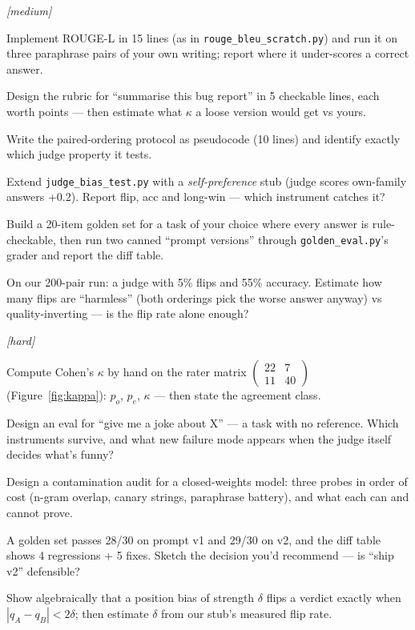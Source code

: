 \emph{[medium]}
\begin{exercise}
Implement ROUGE-L in 15 lines (as in
\texttt{rouge\_bleu\_scratch.py}) and run it on three paraphrase
pairs of your own writing; report where it under-scores a correct
answer.
\end{exercise}
\begin{exercise}
Design the rubric for ``summarise this bug report'' in 5 checkable
lines, each worth points --- then estimate what $\kappa$ a loose
version would get vs yours.
\end{exercise}
\begin{exercise}
Write the paired-ordering protocol as pseudocode (10 lines) and
identify exactly which judge property it tests.
\end{exercise}
\begin{exercise}
Extend \texttt{judge\_bias\_test.py} with a \emph{self-preference}
stub (judge scores own-family answers +0.2). Report flip, acc and
long-win --- which instrument catches it?
\end{exercise}
\begin{exercise}
Build a 20-item golden set for a task of your choice where every
answer is rule-checkable, then run two canned ``prompt versions''
through \texttt{golden\_eval.py}'s grader and report the diff table.
\end{exercise}
\begin{exercise}
On our 200-pair run: a judge with 5\% flips and 55\% accuracy.
Estimate how many flips are ``harmless'' (both orderings pick the
worse answer anyway) vs quality-inverting --- is the flip rate alone
enough?
\end{exercise}

\emph{[hard]}
\begin{exercise}
Compute Cohen's $\kappa$ by hand on the rater matrix
$\begin{pmatrix}22&7\\11&40\end{pmatrix}$ (Figure~\ref{fig:kappa}):
$p_o$, $p_e$, $\kappa$ --- then state the agreement class.
\end{exercise}
\begin{exercise}
Design an eval for ``give me a joke about X'' --- a task with no
reference. Which instruments survive, and what new failure mode
appears when the judge itself decides what's funny?
\end{exercise}
\begin{exercise}
Design a contamination audit for a closed-weights model: three
probes in order of cost (n-gram overlap, canary strings,
paraphrase battery), and what each can and cannot prove.
\end{exercise}
\begin{exercise}
A golden set passes 28/30 on prompt v1 and 29/30 on v2, and the diff
table shows 4 regressions + 5 fixes. Sketch the decision you'd
recommend --- is ``ship v2'' defensible?
\end{exercise}
\begin{exercise}
Show algebraically that a position bias of strength $\delta$ flips a
verdict exactly when $|q_A - q_B| < 2\delta$; then estimate $\delta$
from our stub's measured flip rate.
\end{exercise}

